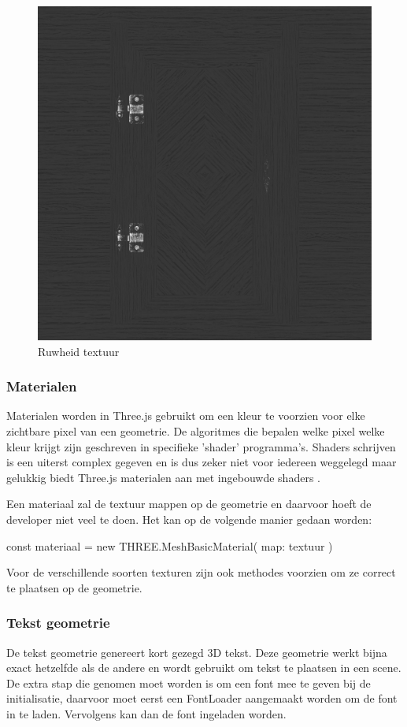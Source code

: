 \begin{figure}
	\centering
	\includegraphics[width=.5\linewidth]{graphics/roughnessTexture}
	\caption[Ruwheid textuur]{Ruwheid textuur}
	\label{fig:roughnessTexture}
\end{figure}

\newpage
\subsubsection{Materialen}

Materialen worden in Three.js gebruikt om een kleur te voorzien voor elke zichtbare pixel van een geometrie. De algoritmes die bepalen welke pixel welke kleur krijgt zijn geschreven in specifieke 'shader' programma's. Shaders schrijven is een uiterst complex gegeven en is dus zeker niet voor iedereen weggelegd maar gelukkig biedt Three.js materialen aan met ingebouwde shaders \autocite{Simon2023}.

Een materiaal zal de textuur mappen op de geometrie en daarvoor hoeft de developer niet veel te doen. Het kan op de volgende manier gedaan worden:

\begin{LVerbatim}
const materiaal = new THREE.MeshBasicMaterial({ map: textuur })
\end{LVerbatim}

Voor de verschillende soorten texturen zijn ook methodes voorzien om ze correct te plaatsen op de geometrie.

\subsubsection{Tekst geometrie}

De tekst geometrie genereert kort gezegd 3D tekst. Deze geometrie werkt bijna exact hetzelfde als de andere en wordt gebruikt om tekst te plaatsen in een scene. De extra stap die genomen moet worden is om een font mee te geven bij de initialisatie, daarvoor moet eerst een FontLoader aangemaakt worden om de font in te laden. Vervolgens kan dan de font ingeladen worden.

